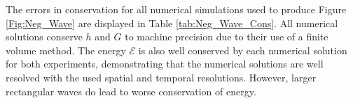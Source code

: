\documentclass[10pt]{elsarticle}
\DeclareRobustCommand{\solidrule}[1][0.25cm]{\rule[0.5ex]{#1}{1.5pt}}
\DeclareRobustCommand{\dashedrule}{\mbox{%
		\solidrule[2mm]\hspace{2mm}\solidrule[2mm]}}
\begin{document}
{\begin{figure}
\end{figure}
%

The errors in conservation for all numerical simulations used to produce Figure \ref{Fig:Neg_Wave} are displayed in Table \ref{tab:Neg_Wave_Cons}. All numerical solutions conserve $h$ and $G$ to machine precision due to their use of a finite volume method. The energy $\mathcal{E}$ is also well conserved by each numerical solution for both experiments, demonstrating that the numerical solutions are well resolved with the used spatial and temporal resolutions. However, larger rectangular waves do lead to worse conservation of energy. 

}
\end{document}
